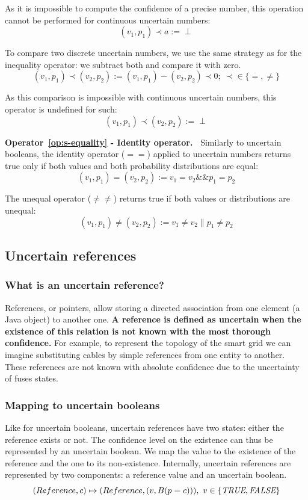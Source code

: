 As it is impossible to compute the confidence of a precise number, this operation cannot be performed for continuous uncertain numbers:
$$(v_1, p_1) \prec a := \perp$$

To compare two discrete uncertain numbers, we use the same strategy as for the inequality operator: we subtract both and compare it with zero.
$$(v_1,p_1) \prec (v_2,p_2) := (v_1,p_1) - (v_2,p_2) \prec 0;~\prec \in \{=, \ne\}$$

As this comparison is impossible with continuous uncertain numbers, this operator is undefined for such:
$$(v_1,p_1) \prec (v_2,p_2) := \perp$$

\noindent\textbf{Operator~\ref{op:s-equality} - Identity operator.~}
Similarly to uncertain booleans, the identity operator ($==$) applied to uncertain numbers returns true only if both values and both probability distributions are equal:
$$(v_1,p_1) = (v_2,p_2) := v_1 = v_2 \&\& p_1 = p_2$$

The unequal operator ($\ne\ne$) returns true if both values or distributions are unequal:
$$(v_1,p_1) \ne (v_2,p_2) := v_1 \ne v_2 \| p_{1} \ne p_{2}$$

\subsection{Uncertain references}
\subsubsection{What is an uncertain reference?}
References, or pointers, allow storing a directed association from one element (\eg a Java object) to another one.
\textbf{A reference is defined as uncertain when the existence of this relation is not known with the most thorough confidence.}
For example, to represent the topology of the smart grid we can imagine substituting cables by simple references from one entity to another.
These references are not known with absolute confidence due to the uncertainty of fuses states.

\subsubsection{Mapping to uncertain booleans}
Like for uncertain booleans, uncertain references have two states: either the reference exists or not.
The confidence level on the existence can thus be represented by an uncertain boolean.
We map the \true{} value to the existence of the reference and the \false{} one to its non-existence.
Internally, uncertain references are represented by two components: a reference value and an uncertain boolean.
$$(Reference, c) \mapsto (Reference, (v, B(p=c))),\ v \in \{\true{}, \false{}\}$$

